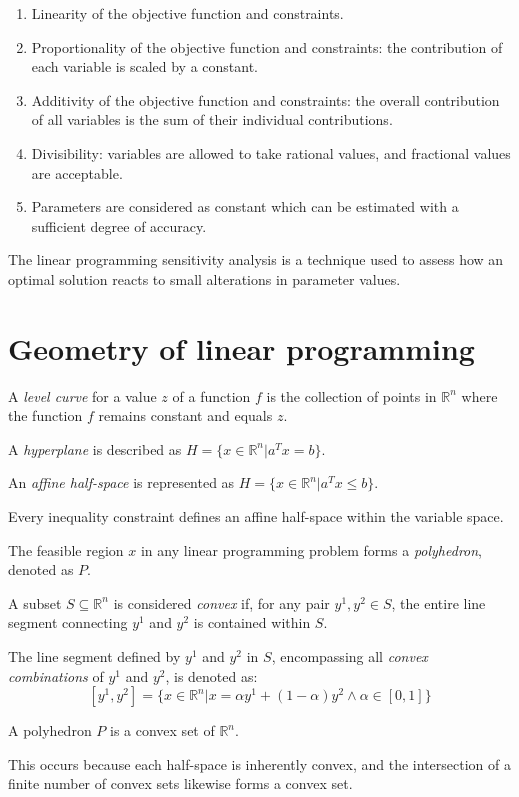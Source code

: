 \documentclass[12pt, a4paper]{report}
\begin{document}
    \begin{enumerate}
        \item Linearity of the objective function and constraints. 
        \item Proportionality of the objective function and constraints: the contribution of each variable is scaled by a constant. 
        \item Additivity of the objective function and constraints: the overall contribution of all variables is the sum of their individual contributions.
        \item Divisibility: variables are allowed to take rational values, and fractional values are acceptable.
        \item Parameters are considered as constant which can be estimated with a sufficient degree of accuracy. 
    \end{enumerate}
    The linear programming sensitivity analysis is a technique used to assess how an optimal solution reacts to small alterations in parameter values.

    \section{Geometry of linear programming}
    \begin{definition}
        A \emph{level curve} for a value $z$ of a function $f$ is the collection of points in $\mathbb{R}^n$  where the function $f$ remains constant and equals $z$.
    
        A \emph{hyperplane} is described as $H=\{x \in \mathbb{R}^n|a^Tx=b\}$. 
    
        An \emph{affine half-space} is represented as $H=\{x \in \mathbb{R}^n|a^Tx \leq b\}$. 
    \end{definition}
    Every inequality constraint defines an affine half-space within the variable space.
    \begin{definition}
        The feasible region $x$  in any linear programming problem forms a \emph{polyhedron}, denoted as $P$. 
    
        A subset $S \subseteq \mathbb{R}^n$ is considered \emph{convex} if, for any pair $y^1,y^2 \in S$, the entire line segment connecting $y^1$ and $y^2$ is contained within $S$. 
    
        The line segment defined by $y^1$ and $y^2 $ in $ S$, encompassing all \emph{convex combinations} of $y^1$ and $y^2$, is denoted as:
        \[[y^1,y^2]=\{x \in \mathbb{R}^n|x=\alpha y^1+(1-\alpha)y^2 \land \alpha \in [0,1]\} \]
    \end{definition}
    \begin{property}
        A polyhedron $P$ is a convex set of $\mathbb{R}^n$. 
    \end{property}
    This occurs because each half-space is inherently convex, and the intersection of a finite number of convex sets likewise forms a convex set.
    
\end{document}
